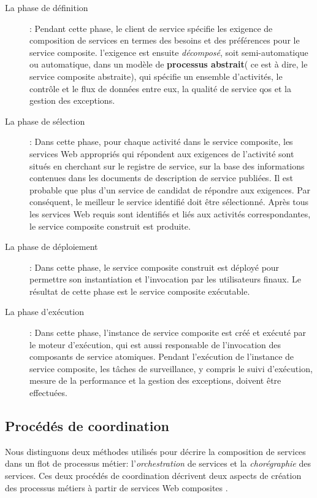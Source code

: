   

  \renewcommand{\descriptionlabel}[1]{\hspace{0.5cm}\textbullet~\textsf{#1}}
  \begin{description}
  \item[La phase de définition]: Pendant cette phase, le client de
    service spécifie les exigence de composition de services en termes
    des besoins et des préférences pour le service
    composite. l'exigence est ensuite \textit{décomposé}, soit
    semi-automatique ou automatique, dans un modèle de
    \textbf{processus abstrait}( ce est à dire, le service composite
    abstraite), qui spécifie un ensemble d'activités, le contrôle et
    le flux de données entre eux, la qualité de service \acrshort{qos}
    et la gestion des exceptions.

  \item[La phase de sélection]: Dans cette phase, pour chaque activité
    dans le service composite, les services Web appropriés qui
    répondent aux exigences de l'activité sont situés en cherchant sur
    le registre de service, sur la base des informations contenues
    dans les documents de description de service publiées. Il est
    probable que plus d'un service de candidat de répondre aux
    exigences. Par conséquent, le meilleur le service identifié doit
    être sélectionné. Après tous les services Web requis sont
    identifiés et liés aux activités correspondantes, le service
    composite construit est produite.

  \item[La phase de déploiement]: Dans cette phase, le service
    composite construit est déployé pour permettre son instantiation
    et l'invocation par les utilisateurs finaux. Le résultat de cette
    phase est le service composite exécutable.

  \item[La phase d'exécution]: Dans cette phase, l'instance de service
    composite est créé et exécuté par le moteur d'exécution, qui est
    aussi responsable de l'invocation des composants de service
    atomiques. Pendant l'exécution de l'instance de service composite,
    les tâches de surveillance, y compris le suivi d'exécution, mesure
    de la performance et la gestion des exceptions, doivent être
    effectuées.
  \end{description}
  \enddescription

  \subsection{Procédés de coordination}
  \label{sec:proc-de-coord}
  Nous distinguons deux méthodes utilisés pour décrire la composition
  de services dans un flot de processus métier: l'\emph{orchestration}
  de services et la \emph{chorégraphie} des services. Ces deux
  procédés de coordination décrivent deux aspects de création des
  processus métiers à partir de services Web composites
  \cite{peltz2003web}.\medskip


